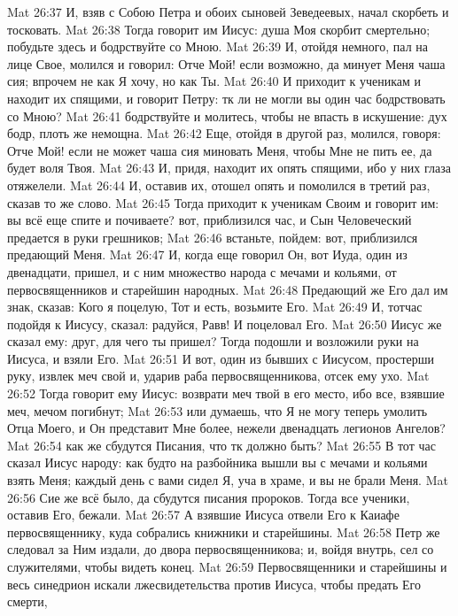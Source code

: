\vs Mat 26:37 И, взяв с Собою Петра и обоих сыновей Зеведеевых, начал скорбеть и тосковать.
\vs Mat 26:38 Тогда говорит им Иисус: душа Моя скорбит смертельно; побудьте здесь и бодрствуйте со Мною.
\vs Mat 26:39 И, отойдя немного, пал на лице Свое, молился и говорил: Отче Мой! если возможно, да минует Меня чаша сия; впрочем не как Я хочу, но как Ты.
\vs Mat 26:40 И приходит к ученикам и находит их спящими, и говорит Петру: тк ли не могли вы один час бодрствовать со Мною?
\vs Mat 26:41 бодрствуйте и молитесь, чтобы не впасть в искушение: дух бодр, плоть же немощна.
\vs Mat 26:42 Еще, отойдя в другой раз, молился, говоря: Отче Мой! если не может чаша сия миновать Меня, чтобы Мне не пить ее, да будет воля Твоя.
\vs Mat 26:43 И, придя, находит их опять спящими, ибо у них глаза отяжелели.
\vs Mat 26:44 И, оставив их, отошел опять и помолился в третий раз, сказав то же слово.
\vs Mat 26:45 Тогда приходит к ученикам Своим и говорит им: вы всё еще спите и почиваете? вот, приблизился час, и Сын Человеческий предается в руки грешников;
\vs Mat 26:46 встаньте, пойдем: вот, приблизился предающий Меня.
\rsbpar\vs Mat 26:47 И, когда еще говорил Он, вот Иуда, один из двенадцати, пришел, и с ним множество народа с мечами и кольями, от первосвященников и старейшин народных.
\vs Mat 26:48 Предающий же Его дал им знак, сказав: Кого я поцелую, Тот и есть, возьмите Его.
\vs Mat 26:49 И, тотчас подойдя к Иисусу, сказал: радуйся, Равв! И поцеловал Его.
\vs Mat 26:50 Иисус же сказал ему: друг, для чего ты пришел? Тогда подошли и возложили руки на Иисуса, и взяли Его.
\vs Mat 26:51 И вот, один из бывших с Иисусом, простерши руку, извлек меч свой и, ударив раба первосвященникова, отсек ему ухо.
\vs Mat 26:52 Тогда говорит ему Иисус: возврати меч твой в его место, ибо все, взявшие меч, мечом погибнут;
\vs Mat 26:53 или думаешь, что Я не могу теперь умолить Отца Моего, и Он представит Мне более, нежели двенадцать легионов Ангелов?
\vs Mat 26:54 как же сбудутся Писания, что тк должно быть?
\vs Mat 26:55 В тот час сказал Иисус народу: как будто на разбойника вышли вы с мечами и кольями взять Меня; каждый день с вами сидел Я, уча в храме, и вы не брали Меня.
\vs Mat 26:56 Сие же всё было, да сбудутся писания пророков. Тогда все ученики, оставив Его, бежали.
\rsbpar\vs Mat 26:57 А взявшие Иисуса отвели Его к Каиафе первосвященнику, куда собрались книжники и старейшины.
\vs Mat 26:58 Петр же следовал за Ним издали, до двора первосвященникова; и, войдя внутрь, сел со служителями, чтобы видеть конец.
\vs Mat 26:59 Первосвященники и старейшины и весь синедрион искали лжесвидетельства против Иисуса, чтобы предать Его смерти,
